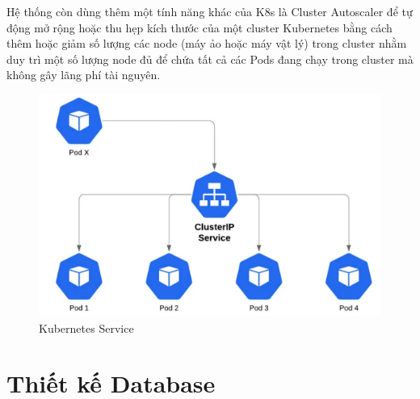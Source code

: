 \noindent Hệ thống còn dùng thêm một tính năng khác của K8s là Cluster Autoscaler để tự động mở rộng hoặc thu hẹp kích thước của một cluster Kubernetes bằng cách thêm hoặc giảm số lượng các node (máy ảo hoặc máy vật lý) trong cluster nhằm duy trì một số lượng node đủ để chứa tất cả các Pods đang chạy trong cluster mà không gây lãng phí tài nguyên.
 \begin{figure}[H]
    \begin{center}
    \includegraphics[scale = 0.25]{images/phat/service-cluster.jpg}
    \vspace*{7mm}
    \caption{Kubernetes Service}
    \end{center}
    \label{}
\end{figure}
\section{Thiết kế Database}
